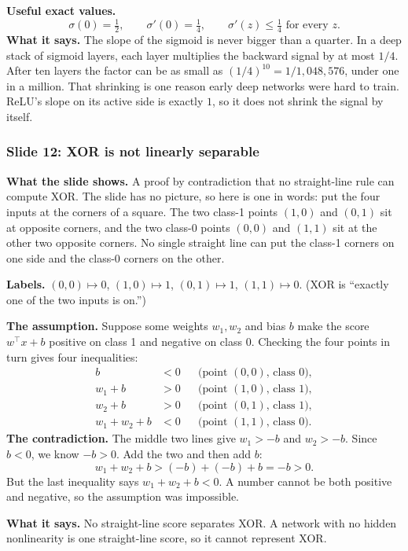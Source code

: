 \textbf{Useful exact values.}
\[
\sigma(0)=\tfrac12, \qquad \sigma'(0)=\tfrac14, \qquad \sigma'(z)\le\tfrac14 \text{ for every } z.
\]
\textbf{What it says.} The slope of the sigmoid is never bigger than a quarter. In a deep stack of sigmoid layers, each layer multiplies the backward signal by at most $1/4$. After ten layers the factor can be as small as $(1/4)^{10} = 1/1{,}048{,}576$, under one in a million. That shrinking is one reason early deep networks were hard to train. ReLU's slope on its active side is exactly $1$, so it does not shrink the signal by itself.

\subsubsection{Slide 12: XOR is not linearly separable}

\textbf{What the slide shows.} A proof by contradiction that no straight-line rule can compute XOR. The slide has no picture, so here is one in words: put the four inputs at the corners of a square. The two class-1 points $(1,0)$ and $(0,1)$ sit at opposite corners, and the two class-0 points $(0,0)$ and $(1,1)$ sit at the other two opposite corners. No single straight line can put the class-1 corners on one side and the class-0 corners on the other.

\textbf{Labels.} $(0,0)\mapsto0$, $(1,0)\mapsto1$, $(0,1)\mapsto1$, $(1,1)\mapsto0$. (XOR is ``exactly one of the two inputs is on.'')

\textbf{The assumption.} Suppose some weights $w_1,w_2$ and bias $b$ make the score $w^\top x + b$ positive on class 1 and negative on class 0. Checking the four points in turn gives four inequalities:
\[
\begin{aligned}
b &< 0 &&\text{(point }(0,0)\text{, class 0)},\\
w_1 + b &> 0 &&\text{(point }(1,0)\text{, class 1)},\\
w_2 + b &> 0 &&\text{(point }(0,1)\text{, class 1)},\\
w_1 + w_2 + b &< 0 &&\text{(point }(1,1)\text{, class 0)}.
\end{aligned}
\]
\textbf{The contradiction.} The middle two lines give $w_1>-b$ and $w_2>-b$. Since $b<0$, we know $-b>0$. Add the two and then add $b$:
\[
w_1+w_2+b > (-b)+(-b)+b = -b > 0.
\]
But the last inequality says $w_1+w_2+b<0$. A number cannot be both positive and negative, so the assumption was impossible.

\textbf{What it says.} No straight-line score separates XOR. A network with no hidden nonlinearity is one straight-line score, so it cannot represent XOR.

